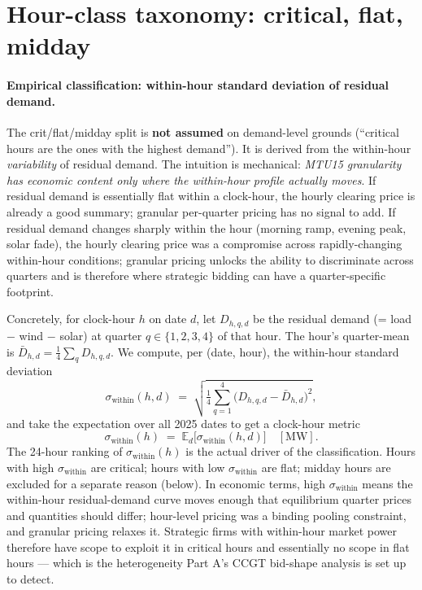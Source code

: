 \documentclass[11pt,a4paper]{article}
\begin{document}
\section{Hour-class taxonomy: critical, flat, midday}\label{sec:prov:hour_class}

\paragraph{Empirical classification: within-hour standard deviation of residual demand.}
The crit/flat/midday split is \textbf{not assumed} on demand-level grounds (``critical hours are the ones with the highest demand''). It is derived from the within-hour \emph{variability} of residual demand. The intuition is mechanical: \emph{MTU15 granularity has economic content only where the within-hour profile actually moves}. If residual demand is essentially flat within a clock-hour, the hourly clearing price is already a good summary; granular per-quarter pricing has no signal to add. If residual demand changes sharply within the hour (morning ramp, evening peak, solar fade), the hourly clearing price was a compromise across rapidly-changing within-hour conditions; granular pricing unlocks the ability to discriminate across quarters and is therefore where strategic bidding can have a quarter-specific footprint.

Concretely, for clock-hour $h$ on date $d$, let $D_{h,q,d}$ be the residual demand (= load $-$ wind $-$ solar) at quarter $q \in \{1,2,3,4\}$ of that hour. The hour's quarter-mean is $\bar D_{h,d} = \tfrac{1}{4}\sum_q D_{h,q,d}$. We compute, per (date, hour), the within-hour standard deviation
\[
  \sigma_{\text{within}}(h, d) \;=\; \sqrt{\tfrac{1}{4}\sum_{q=1}^{4}\bigl(D_{h,q,d} - \bar D_{h,d}\bigr)^2},
\]
and take the expectation over all 2025 dates to get a clock-hour metric
\[
  \sigma_{\text{within}}(h) \;=\; \mathbb{E}_d\bigl[\sigma_{\text{within}}(h, d)\bigr] \quad [\text{MW}].
\]
The 24-hour ranking of $\sigma_{\text{within}}(h)$ is the actual driver of the classification. Hours with high $\sigma_{\text{within}}$ are critical; hours with low $\sigma_{\text{within}}$ are flat; midday hours are excluded for a separate reason (below). In economic terms, high $\sigma_{\text{within}}$ means the within-hour residual-demand curve moves enough that equilibrium quarter prices and quantities should differ; hour-level pricing was a binding pooling constraint, and granular pricing relaxes it. Strategic firms with within-hour market power therefore have scope to exploit it in critical hours and essentially no scope in flat hours --- which is the heterogeneity Part A's CCGT bid-shape analysis is set up to detect.
\end{document}
